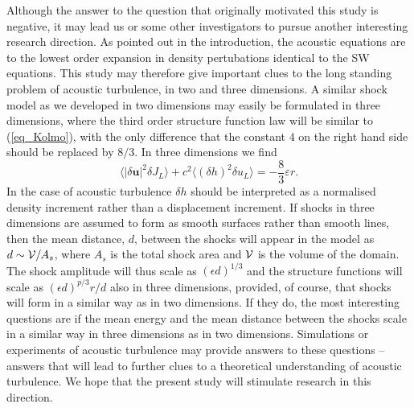 \documentclass{jfm}
\newcommand{\uu}{\textbf{u}}
\newcommand{\meane}[1]{\langle #1 \rangle}
\begin{document}
Although the answer to the question that originally motivated this study is
negative, it may lead us or some other investigators to pursue another
interesting research direction. As pointed out in the introduction, the
acoustic equations are to the lowest order expansion in density pertubations
identical to the SW equations. This study may therefore give important clues to
the long standing problem of acoustic turbulence, in two and three dimensions.
A similar shock model as we developed in two dimensions may easily be
formulated in three dimensions, where the third order structure function law
will be similar to (\ref{eq_Kolmo}), with the only difference that the constant
$ 4 $ on the right hand side should be replaced by $ 8/3 $. In three dimensions
we find
\begin{equation}
\meane{ |\delta \uu|^2 \delta J_L }
+ c^2\meane{ (\delta h)^2 \delta u_L } = - \frac{8}{3} \varepsilon r. \label{eq_Kolmo3}
\end{equation}
In the case of acoustic turbulence $ \delta h $ should be interpreted as a
normalised density increment rather than a displacement increment. If shocks in
three dimensions are assumed to form as smooth surfaces rather than smooth
lines, then the mean distance, $ d $, between the shocks will appear in the
model as $ d \sim {\cal{V}}/A_s $, where $ A_{s} $ is the total shock area and
$ \cal{V} $ is the volume of the domain. The shock amplitude will thus scale as
$ (\epsilon d)^{1/3} $ and the structure functions will scale as $ (\epsilon
d)^{p/3} r/d $ also in three dimensions, provided, of course, that shocks will
form in a similar way as in two dimensions. If they do, the most interesting
questions are if the mean energy and the mean distance between the shocks scale
in a similar way in three dimensions as in two dimensions. Simulations or
experiments of acoustic turbulence may provide answers to these questions --
answers that will lead to further clues to a theoretical understanding of
acoustic turbulence. We hope that the present study will stimulate research in
this direction.




%





\end{document}
